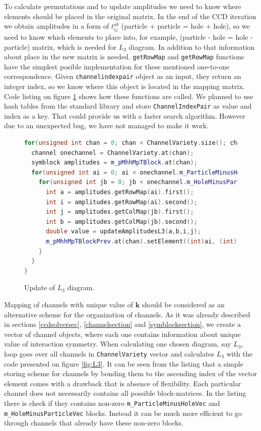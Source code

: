 \documentclass[twoside,english]{uiofysmaster}
\newcommand{\classname}[1]{\texttt{#1}}
\begin{document}
To calculate permutations and to update amplitudes we need to know
where elements should be placed in the original matrix. In the end of
the CCD iteration we obtain amplitudes in a form of $t_{ij}^{ab}$
(particle + particle = hole + hole), so we need to know which elements
to place into, for example, (particle - hole = hole - particle)
matrix, which is needed for $L_3$ diagram. In addition to that
information about place in the new matrix is
needed. \classname{getRowMap} and \classname{getRowMap} functions have
the simplest posible implementation for these mentioned one-to-one
correspondence. Given \classname{channelindexpair} object as an input,
they return an integer index, so we know where this object is located
in the mapping matrix. Code listing on figure \ref{fig:L3update} shows
how these functions are called.  We planned to use hash tables from
the standard library and store \classname{ChannelIndexPair} as value
and index as a key. That could provide us with a faster search
algorithm. However due to an unexpected bug, we have not managed to
make it work.
\begin{figure}
\begin{lstlisting}[language=C++]
for(unsigned int chan = 0; chan < ChannelVariety.size(); chan++){
  channel onechannel = ChannelVariety.at(chan);
  symblock amplitudes = m_pMhhMpTBlock.at(chan);
  for(unsigned int ai = 0; ai < onechannel.m_ParticleMinusHoleVec.size(); ai++){
    for(unsigned int jb = 0; jb < onechannel.m_HoleMinusParticleVec.size(); jb++){
      int a = amplitudes.getRowMap(ai).first();
      int i = amplitudes.getRowMap(ai).second();
      int j = amplitudes.getColMap(jb).first();
      int b = amplitudes.getColMap(jb).second();
      double value = updateAmplitudesL3(a,b,i,j);
      m_pMhhMpTBlockPrev.at(chan).setElement((int)ai, (int)jb, value);
    }
  }
}
\end{lstlisting}
\caption{Update of $L_3$ diagram.}\label{fig:L3update}
\end{figure}


Mapping of channels with unique value of $\mathbf{k}$ should be considered as an alternative scheme for the organization of channels.
As it was already described in sections \ref{ccdsolversec}, \ref{channelsection} and \ref{symblocksection}, we create a vector of channel objects, where each one contains information about unique value of interaction symmetry. When calculating one chosen diagram, say $L_3$, loop goes over all channels in \classname{ChannelVariety} vector and calculates $L_3$ with the code presented on figure \ref{fig:L3}. It can be seen from the listing that a simple storing scheme for channels by bonding them to the ascending index of the vector element comes with a drawback that is absence of flexibility. Each particular channel does not necessarily contains all possible block-matrices. In the listing there is check if they contains non-zero \classname{m_ParticleMinusHoleVec} and \classname{m_HoleMinusParticleVec} blocks. Instead it can be much more efficient to go through channels that already have these non-zero blocks.
\end{document}
